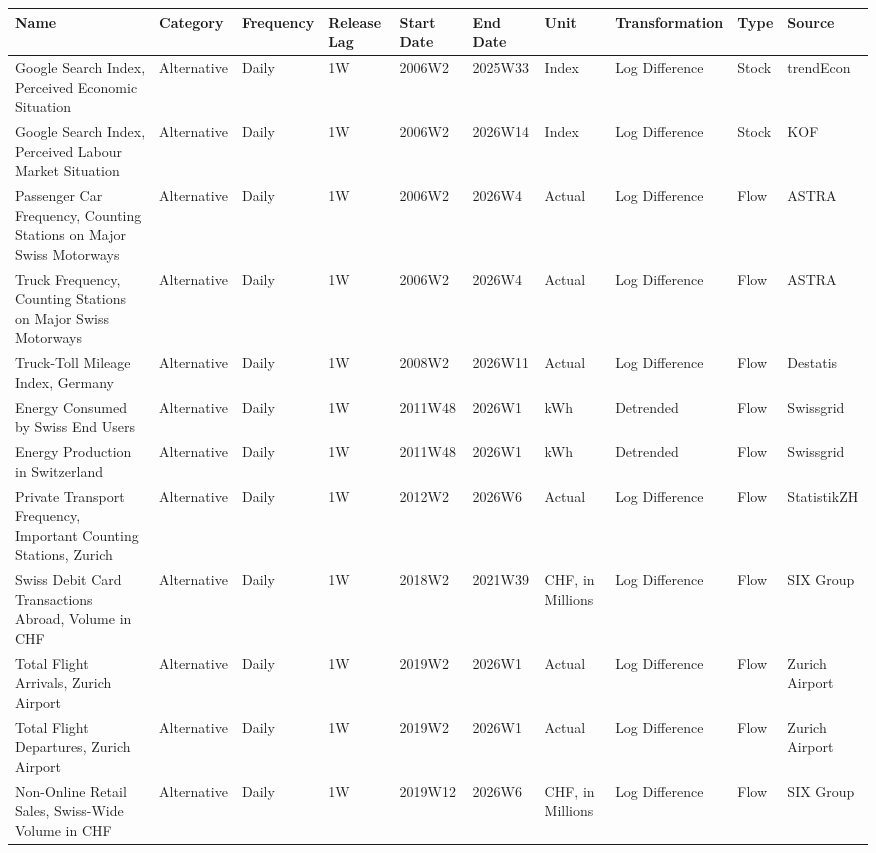 \begin{table}[ht]
\centering
\begin{tabular}{llllllllll}
  \hline
Name & Category & Frequency & Release Lag & Start Date & End Date & Unit & Transformation & Type & Source \\ 
  \hline
Google Search Index, Perceived Economic Situation & Alternative & Daily & 1W & 2006W2 & 2025W33 & Index & Log Difference & Stock & trendEcon \\ 
  Google Search Index, Perceived Labour Market Situation & Alternative & Daily & 1W & 2006W2 & 2026W14 & Index & Log Difference & Stock & KOF \\ 
  Passenger Car Frequency, Counting Stations on Major Swiss Motorways & Alternative & Daily & 1W & 2006W2 & 2026W4 & Actual & Log Difference & Flow & ASTRA \\ 
  Truck Frequency, Counting Stations on Major Swiss Motorways & Alternative & Daily & 1W & 2006W2 & 2026W4 & Actual & Log Difference & Flow & ASTRA \\ 
  Truck-Toll Mileage Index, Germany & Alternative & Daily & 1W & 2008W2 & 2026W11 & Actual & Log Difference & Flow & Destatis \\ 
  Energy Consumed by Swiss End Users & Alternative & Daily & 1W & 2011W48 & 2026W1 & kWh & Detrended & Flow & Swissgrid \\ 
  Energy Production in Switzerland & Alternative & Daily & 1W & 2011W48 & 2026W1 & kWh & Detrended & Flow & Swissgrid \\ 
  Private Transport Frequency, Important Counting Stations, Zurich & Alternative & Daily & 1W & 2012W2 & 2026W6 & Actual & Log Difference & Flow & StatistikZH \\ 
  Swiss Debit Card Transactions Abroad, Volume in CHF & Alternative & Daily & 1W & 2018W2 & 2021W39 & CHF, in Millions & Log Difference & Flow & SIX Group \\ 
  Total Flight Arrivals, Zurich Airport & Alternative & Daily & 1W & 2019W2 & 2026W1 & Actual & Log Difference & Flow & Zurich Airport \\ 
  Total Flight Departures, Zurich Airport & Alternative & Daily & 1W & 2019W2 & 2026W1 & Actual & Log Difference & Flow & Zurich Airport \\ 
  Non-Online Retail Sales, Swiss-Wide Volume in CHF & Alternative & Daily & 1W & 2019W12 & 2026W6 & CHF, in Millions & Log Difference & Flow & SIX Group \\ 

\end{tabular}
\end{table}
